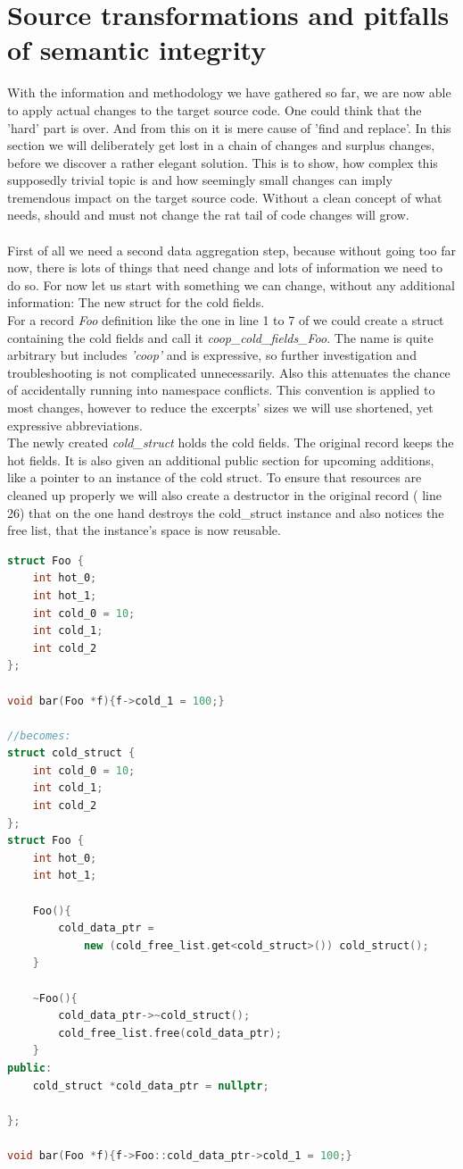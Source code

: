 \chapter{Source transformations and pitfalls of semantic integrity}
With the information and methodology we have gathered so far, we are now able to apply actual changes to the target source code. One could think that the 'hard' part is over. And from this on it is mere cause of 'find and replace'. In this section we will deliberately get lost in a chain of changes and surplus changes, before we discover a rather elegant solution. This is to show, how complex this supposedly trivial topic is and how seemingly small changes can imply tremendous impact on the target source code. Without a clean concept of what needs, should and must not change the rat tail of code changes will grow.\\\\
First of all we need a second data aggregation step, because without going too far now, there is lots of things that need change and lots of information we need to do so. For now let us start with something we can change, without any additional information: The new struct for the cold fields.\\
For a record \textit{Foo} definition like the one in line 1 to 7 of  we could create a struct containing the cold fields and call it \textit{coop\_cold\_fields\_Foo}. The name is quite arbitrary but includes \textit{'coop'} and is expressive, so further investigation and troubleshooting is not complicated unnecessarily. Also this attenuates the chance of accidentally running into namespace conflicts. This convention is applied to most changes, however to reduce the excerpts' sizes we will use shortened, yet expressive abbreviations.\\
The newly created \textit{cold\_struct} holds the cold fields. The original record keeps the hot fields. It is also given an additional public section for upcoming additions, like a pointer to an instance of the cold struct. To ensure that resources are cleaned up properly we will also create a destructor in the original record ( line 26) that on the one hand destroys the cold\_struct instance and also notices the free list, that the instance's space is now reusable.
\begin{lstlisting}[language=C++,name={Example of how a record might be split. However this split implies problematic aftereffects.},label={example_split_0}]
struct Foo {
	int hot_0;
	int hot_1;
	int cold_0 = 10;
	int cold_1;
	int cold_2
};

void bar(Foo *f){f->cold_1 = 100;}

//becomes:
struct cold_struct {
	int cold_0 = 10;
	int cold_1;
	int cold_2
};
struct Foo {
	int hot_0;
	int hot_1;
	
	Foo(){
		cold_data_ptr = 
			new (cold_free_list.get<cold_struct>()) cold_struct();
	}
	
	~Foo(){
		cold_data_ptr->~cold_struct();
		cold_free_list.free(cold_data_ptr);
	}
public:
	cold_struct *cold_data_ptr = nullptr;

};

void bar(Foo *f){f->Foo::cold_data_ptr->cold_1 = 100;}
\end{lstlisting}
